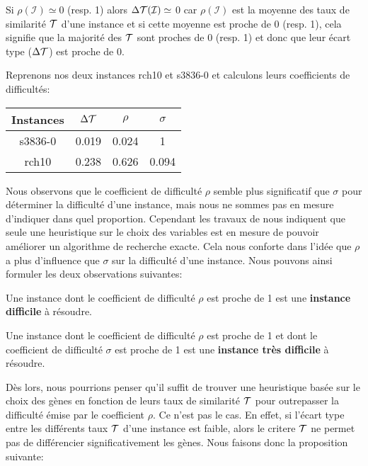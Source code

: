\begin{remarque}
	Si $\rho(\mathcal{I}) \simeq 0$ (resp. 1) alors $\Delta\cal{T}(\mathcal{I}) \simeq $ 0 car $\rho(\mathcal{I})$ est la moyenne des taux de similarité $\cal{T}$ d'une instance et si cette moyenne est proche de 0 (resp. 1), cela signifie que la majorité des $\cal{T}$ sont proches de 0 (resp. 1) et donc que leur écart type ($\Delta\cal{T}$) est proche de 0.
	\label{remDeltaTau}
\end{remarque}


Reprenons nos deux instances rch10 et s3836-0 et calculons leurs coefficients de difficultés:

\begin{center}
\begin{tabular}{|c|c|c|c|}
\hline 
Instances & $\Delta\cal{T} $ & $\rho$ & $\sigma$ \\ 
\hline 
s3836-0 & 0.019 & 0.024 & 1 \\ 
\hline
rch10 & 0.238 & 0.626 & 0.094 \\ 
\hline
\end{tabular} 
\end{center}

Nous observons que le coefficient de difficulté $\rho$ semble plus significatif que $\sigma$ pour déterminer la difficulté d'une instance, mais nous ne sommes pas en mesure d'indiquer dans quel proportion. Cependant les travaux de \cite{Chhel2013} nous indiquent que seule une heuristique sur le choix des variables est en mesure de pouvoir améliorer un algorithme de recherche exacte. Cela nous conforte dans l'idée que $\rho$ a plus d'influence que $\sigma$ sur la difficulté d'une instance. Nous pouvons ainsi formuler les deux observations suivantes:

\begin{observation}
Une instance dont le coefficient de difficulté $\rho$ est proche de 1 est une \textbf{instance difficile} à résoudre.
\end{observation}

\begin{observation}
Une instance dont le coefficient de difficulté $\rho$ est proche de 1 et dont le coefficient de difficulté $\sigma$ est proche de 1 est une \textbf{instance très difficile} à résoudre.
\end{observation}

Dès lors, nous pourrions penser qu'il suffit de trouver une heuristique basée sur le choix des gènes en fonction de leurs taux de similarité $\cal{T}$ pour outrepasser la difficulté émise par le coefficient $\rho$. Ce n'est pas le cas. En effet, si l'écart type entre les différents taux $\cal{T}$ d'une instance est faible, alors le critere $\cal{T}$ ne permet pas de différencier significativement les gènes. Nous faisons donc la proposition suivante: 

